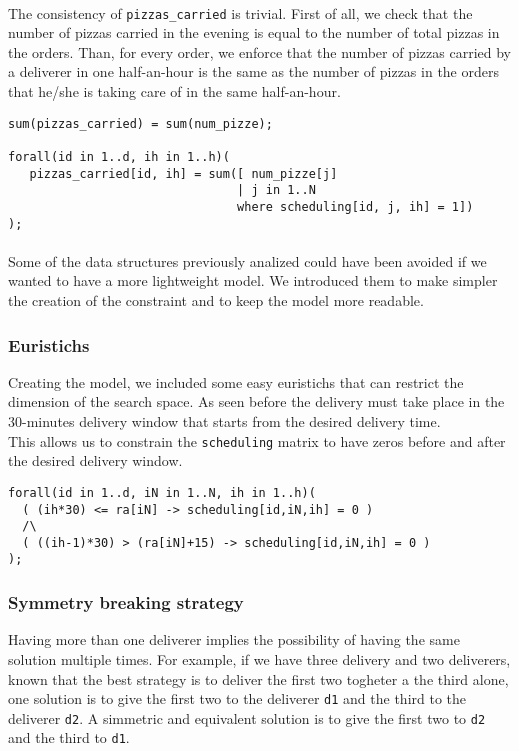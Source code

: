 \documentclass[10pt]{article}
\begin{document}
	\paragraph*{}
	The consistency of \texttt{pizzas\_carried} is trivial. First of all, we check that
	the number of pizzas carried in the evening is equal to the number of total pizzas in the 
	orders. Than, for every order, we enforce that the number of pizzas carried by a deliverer 
	in one half-an-hour is the same as the number of pizzas in the orders that he/she 
	is taking care of in the same half-an-hour.
	\begin{verbatim}
sum(pizzas_carried) = sum(num_pizze);

forall(id in 1..d, ih in 1..h)(
   pizzas_carried[id, ih] = sum([ num_pizze[j]
                                | j in 1..N 
                                where scheduling[id, j, ih] = 1])
);
	\end{verbatim}

	\paragraph*{}
	Some of the data structures previously analized could have been avoided if we 
	wanted to have a more lightweight model. We introduced them to make simpler the
	creation of the constraint and to keep the model more readable.

	\subsubsection{Euristichs}

	Creating the model, we included some easy euristichs that can restrict the dimension
	of the search space. As seen before the delivery must take place in the 30-minutes delivery window
	that starts from the desired delivery time.\\
	This allows us to constrain the \texttt{scheduling} matrix to have zeros before
	and after the desired delivery window.
	\begin{verbatim}
forall(id in 1..d, iN in 1..N, ih in 1..h)(
  ( (ih*30) <= ra[iN] -> scheduling[id,iN,ih] = 0 )
  /\
  ( ((ih-1)*30) > (ra[iN]+15) -> scheduling[id,iN,ih] = 0 )
);
	\end{verbatim}

	\subsubsection{Symmetry breaking strategy}
	Having more than one deliverer implies the possibility of having the same solution 
	multiple times. For example, if we have three delivery and two deliverers, known that
	the best strategy is to deliver the first two togheter a the third alone, one solution is 
	to give the first two to the deliverer \texttt{d1} and the third to the deliverer \texttt{d2}.
	A simmetric and equivalent solution is to give the first two to \texttt{d2} and 
	the third to \texttt{d1}.
\end{document}
